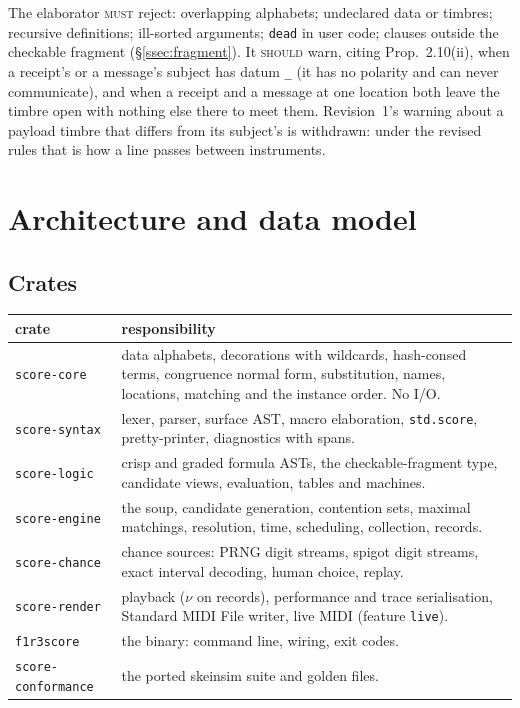 \documentclass[11pt,a4paper]{article}
\theoremstyle{definition}
\theoremstyle{remark}
\newcommand{\MUST}{\textsc{must}}
\newcommand{\SHOULD}{\textsc{should}}
\begin{document}
The elaborator \MUST{} reject: overlapping alphabets; undeclared data or
timbres; recursive definitions; ill-sorted arguments; \texttt{dead} in user
code; clauses outside the checkable fragment (\S\ref{ssec:fragment}). It
\SHOULD{} warn, citing Prop.~2.10(ii), when a receipt's or a message's subject
has datum \texttt{\_} (it has no polarity and can never communicate), and when a
receipt and a message at one location both leave the timbre open with nothing
else there to meet them. Revision~1's warning about a payload timbre that
differs from its subject's is withdrawn: under the revised rules that is how a
line passes between instruments.

\section{Architecture and data model}\label{sec:arch}

\subsection{Crates}

\begin{center}
\small
\begin{tabular}{@{}l>{\raggedright\arraybackslash}p{9.2cm}@{}}
\toprule
crate & responsibility \\
\midrule
\texttt{score-core}   & data alphabets, decorations with wildcards,
  hash-consed terms, congruence normal form, substitution, names, locations,
  matching and the instance order. No I/O. \\
\texttt{score-syntax} & lexer, parser, surface AST, macro elaboration,
  \texttt{std.score}, pretty-printer, diagnostics with spans. \\
\texttt{score-logic}  & crisp and graded formula ASTs, the checkable-fragment
  type, candidate views, evaluation, tables and machines. \\
\texttt{score-engine} & the soup, candidate generation, contention sets,
  maximal matchings, resolution, time, scheduling, collection, records. \\
\texttt{score-chance} & chance sources: PRNG digit streams, spigot digit
  streams, exact interval decoding, human choice, replay. \\
\texttt{score-render} & playback ($\nu$ on records), performance and trace
  serialisation, Standard MIDI File writer, live MIDI (feature
  \texttt{live}). \\
\texttt{f1r3score}    & the binary: command line, wiring, exit codes. \\
\texttt{score-conformance} & the ported skeinsim suite and golden files. \\
\bottomrule
\end{tabular}
\end{center}
\end{document}
